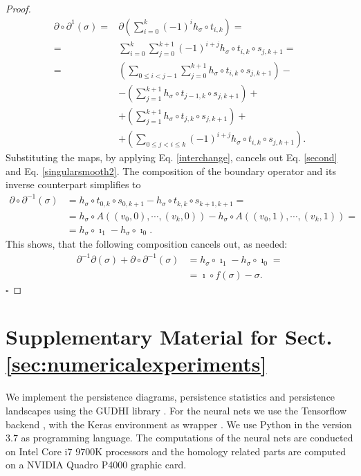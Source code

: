 \documentclass[envcountsect,runningheads]{llncs}
\renewcommand{\qed}{\hfill$\square$}
\begin{document}
\begin{proof}
\begin{align}
	\partial \circ \partial^{1}(\sigma) = &\partial \left( \sum_{i=0}^{k} (-1)^i h_\sigma \circ t_{i,k} \right) = \\
	= & \sum_{i=0}^{k}\sum_{j=0}^{k+1} (-1)^{i+j} h_\sigma \circ t_{i,k} \circ s_{j,k+1} = \\
	= & \left( \sum_{0 \leq i < j-1} \sum_{j=0}^{k+1} h_\sigma \circ t_{i,k} \circ s_{j,k+1}\right) -\\
	\label{second}
	&- \left( \sum_{j=1}^{k+1} h_\sigma \circ t_{j-1,k} \circ s_{j,k+1} \right) + \\
	\label{singularsmooth1}
	&+ \left( \sum_{j=1}^{k+1} h_\sigma \circ t_{j,k} \circ s_{j,k+1} \right) + \\
	\label{singularsmooth2}
	&+ \left( \sum_{0 \leq j < i \leq k} (-1)^{i+j} h_\sigma \circ t_{i,k} \circ s_{j,k+1} \right).
\end{align}
Substituting the maps, by applying Eq. \ref{interchange}, cancels out Eq. \ref{second} and Eq. \ref{singularsmooth2}. The composition of the boundary operator and its inverse counterpart simplifies to
\begin{align}
	\partial \circ \partial^{-1}(\sigma) &= h_\sigma \circ t_{0,k} \circ s_{0,k+1} - h_\sigma \circ t_{k,k} \circ s_{k+1,k+1} = \\
	&= h_\sigma \circ A((v_0,0), \cdots, (v_k,0)) - h_\sigma \circ A((v_0,1), \cdots, (v_k,1)) = \\
	&= h_\sigma \circ \imath_1 - h_\sigma \circ \imath_0.
\end{align}
This shows, that the following composition cancels out, as needed:
\begin{align}
	\partial^{-1} \partial(\sigma) + \partial \circ \partial^{-1}(\sigma) &= h_\sigma \circ \imath_1 - h_\sigma \circ \imath_0 = \\
	&= \imath \circ f(\sigma) - \sigma.
\end{align}
\qed
\end{proof}

\section{Supplementary Material for Sect. \ref{sec:numericalexperiments}}
\label{appx:numexp}
We implement the persistence diagrams, persistence statistics and persistence landscapes using the GUDHI library \cite{gudhi:urm}. For the neural nets we use the Tensorflow backend \cite{tensorflow2015-whitepaper}, with the Keras environment as wrapper \cite{chollet2015keras}. We use Python in the version $3.7$ as programming language. The computations of the neural nets are conducted on Intel Core i7 9700K processors and the homology related parts are computed on a NVIDIA Quadro P4000 graphic card.
\end{document}
